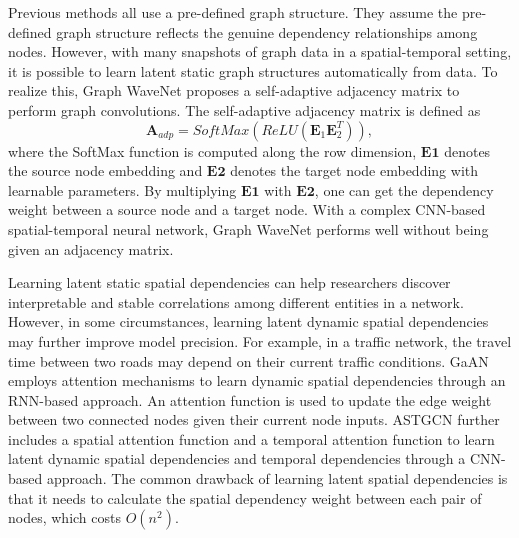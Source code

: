Previous methods all use a pre-defined graph structure. They assume the pre-defined graph structure reflects the genuine dependency relationships among nodes. However,  with many snapshots of graph data in a spatial-temporal setting, it is possible to learn latent static graph structures automatically from data. To realize this, Graph WaveNet \cite{wu2019graph} proposes a self-adaptive adjacency matrix to perform graph convolutions. The self-adaptive adjacency matrix is defined as 
\begin{equation}
    \mathbf{A}_{adp}=SoftMax(ReLU(\mathbf{E}_1\mathbf{E}_2^T)),
\end{equation}
where the SoftMax function is computed along the row dimension, $\mathbf{E1}$ denotes the source node embedding and $\mathbf{E2}$ denotes the target node embedding with learnable parameters. By multiplying $\mathbf{E1}$ with $\mathbf{E2}$, one can get the dependency weight between a source node and a target node.
With a complex CNN-based spatial-temporal neural network,  Graph WaveNet performs well without being given an adjacency matrix.

Learning latent static spatial dependencies can help researchers discover interpretable and stable correlations among different entities in a network. However, in some circumstances, learning latent dynamic spatial dependencies may further improve model precision. For example, in a traffic network, the travel time between two roads may depend on their current traffic conditions. GaAN \cite{zhang2018gaan} employs attention mechanisms to learn dynamic spatial dependencies through an RNN-based approach. An attention function is used to update the edge weight between two connected nodes given their current node inputs.  
ASTGCN \cite{guo2019att} further includes a spatial attention function and a temporal attention function to learn latent dynamic spatial dependencies and temporal dependencies through a CNN-based approach. 
The common drawback of learning latent spatial dependencies is that it needs to calculate the spatial dependency weight between each pair of nodes, which costs $O(n^2)$.




